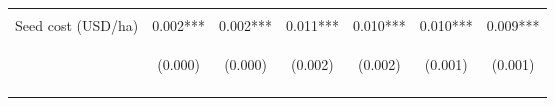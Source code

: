 \begin{center}
\begin{tabular}{lcccccc}
\vspace{4pt} & \begin{footnotesize}[0.859]\end{footnotesize} & \begin{footnotesize}[0.514]\end{footnotesize} & \begin{footnotesize}[0.737]\end{footnotesize} & \begin{footnotesize}[0.998]\end{footnotesize} & \begin{footnotesize}[0.000]\end{footnotesize} & \begin{footnotesize}[0.000]\end{footnotesize} \\
Seed cost (USD/ha) & 0.002*** & 0.002*** & 0.011*** & 0.010*** & 0.010*** & 0.009*** \\
 & \begin{footnotesize}(0.000)\end{footnotesize} & \begin{footnotesize}(0.000)\end{footnotesize} & \begin{footnotesize}(0.002)\end{footnotesize} & \begin{footnotesize}(0.002)\end{footnotesize} & \begin{footnotesize}(0.001)\end{footnotesize} & \begin{footnotesize}(0.001)\end{footnotesize} \\
\vspace{4pt} & \begin{footnotesize}[0.000]\end{footnotesize} & \begin{footnotesize}[0.000]\end{footnotesize} & \begin{footnotesize}[0.000]\end{footnotesize} & \begin{footnotesize}[0.000]\end{footnotesize} & \begin{footnotesize}[0.000]\end{footnotesize} & \begin{footnotesize}[0.000]\end{footnotesize} \\

\end{tabular}
\end{center}
